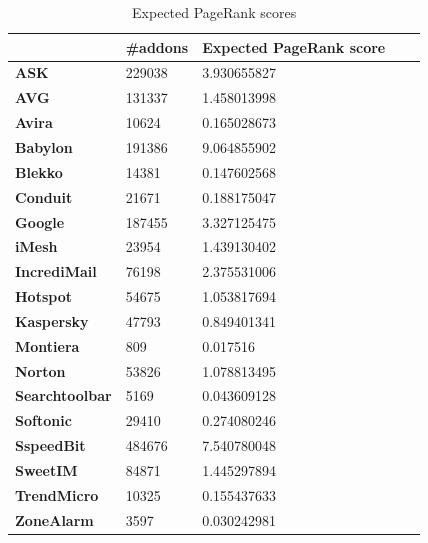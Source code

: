 \documentclass[11pt,oneside]{book}
\begin{document}
\begin{table}[t]
\centering
\caption{Expected PageRank scores}
\label{table:pagerank_scores}
\begin{tabular}{@{}lllll@{}}
\toprule
 & \textbf{\#addons} &  \textbf{Expected PageRank score} &  \\ \midrule
\textbf{ASK} & 229038 & 3.930655827 \\
\textbf{AVG} & 131337 & 1.458013998 \\
\textbf{Avira} & 10624 & 0.165028673 \\
\textbf{Babylon} & 191386 & 9.064855902 \\
\textbf{Blekko} & 14381 & 0.147602568 \\
\textbf{Conduit} & 21671 & 0.188175047 \\
\textbf{Google} & 187455 & 3.327125475 \\
\textbf{iMesh} & 23954 & 1.439130402 \\
\textbf{IncrediMail} & 76198 & 2.375531006 \\
\textbf{Hotspot} & 54675 & 1.053817694 \\
\textbf{Kaspersky} & 47793 & 0.849401341 \\
\textbf{Montiera} & 809 & 0.017516 \\
\textbf{Norton} & 53826 & 1.078813495 \\
\textbf{Searchtoolbar} & 5169 & 0.043609128 \\
\textbf{Softonic} & 29410 & 0.274080246 \\
\textbf{SspeedBit} & 484676 & 7.540780048 \\
\textbf{SweetIM} & 84871 & 1.445297894 \\
\textbf{TrendMicro} & 10325 & 0.155437633 \\
\textbf{ZoneAlarm} & 3597 & 0.030242981 \\ \hline
\end{tabular}
\end{table}

\end{document}
